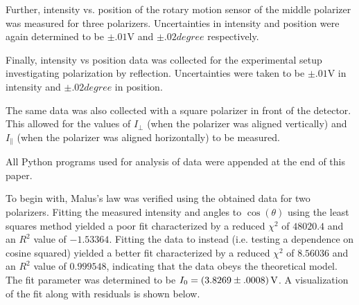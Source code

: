 \begin{paper}
	Further, intensity vs. position of the rotary motion sensor of the middle polarizer was measured for three polarizers. Uncertainties in intensity and position were again determined to be \( \pm .01 \si{\volt} \) and \( \pm .02\si{degree}\) respectively.
	
	Finally, intensity vs position data was collected for the experimental setup investigating polarization by reflection. Uncertainties were taken to be \( \pm .01 \si{\volt} \) in intensity and \( \pm .02\si{degree}\) in position.
	
	The same data was also collected with a square polarizer in front of the detector. This allowed for the values of $I_{\perp}$ (when the polarizer was aligned vertically) and $I_{\parallel}$ (when the polarizer was aligned horizontally) to be measured.
	
	
	All Python programs used for analysis of data were appended at the end of this paper.
	
	To begin with, Malus's law was verified using the obtained data for two polarizers. Fitting the measured intensity and angles to \( \cos (\theta )\) using the least squares method yielded a poor fit characterized by a reduced \( \chi ^ 2 \) of \( 48020.4 \) and an \( R^2 \) value of \( -1.53364 \). Fitting the data to \eqMalusLaw instead (i.e. testing a dependence on cosine squared) yielded a better fit characterized by a reduced \( \chi ^ 2 \)	of \( 8.56036 \) and an \( R ^ 2 \) value of \( 0.999548 \), indicating that the data obeys the theoretical model. The fit parameter was determined to be \( I_0 = \left(3.8269 \pm .0008\right) \si{\volt}\). A visualization of the fit along with residuals is shown below.\pagebreak
	

\end{paper}
